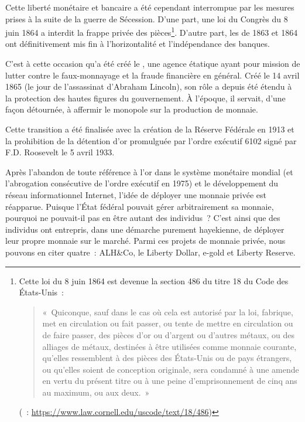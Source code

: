 Cette liberté monétaire et bancaire a été cependant interrompue par les mesures prises à la suite de la guerre de Sécession. D'une part, une loi du Congrès du 8 juin 1864 a interdit la frappe privée des pièces\footnote{Cette loi du 8 juin 1864 est devenue la section 486 du titre 18 du Code des États-Unis~:
\begin{quote}
\footnotesize «~Quiconque, sauf dans le cas où cela est autorisé par la loi, fabrique, met en circulation ou fait passer, ou tente de mettre en circulation ou de faire passer, des pièces d'or ou d'argent ou d'autres métaux, ou des alliages de métaux, destinées à être utilisées comme monnaie courante, qu'elles ressemblent à des pièces des États-Unis ou de pays étrangers, ou qu'elles soient de conception originale, sera condamné à une amende en vertu du présent titre ou à une peine d'emprisonnement de cinq ans au maximum, ou aux deux.~»
\end{quote} %
(~: \url{https://www.law.cornell.edu/uscode/text/18/486})}. D'autre part, les  de 1863 et 1864 ont définitivement mis fin à l'horizontalité et l'indépendance des banques.

C'est à cette occasion qu'a été créé le , une agence étatique ayant pour mission de lutter contre le faux-monnayage et la fraude financière en général. Créé le 14 avril 1865 (le jour de l'assassinat d'Abraham Lincoln), son rôle a depuis été étendu à la protection des hautes figures du gouvernement. À l'époque, il servait, d'une façon détournée, à affermir le monopole sur la production de monnaie.

Cette transition a été finalisée avec la création de la Réserve Fédérale en 1913 et la prohibition de la détention d'or promulguée par l'ordre exécutif 6102 signé par F.D. Roosevelt le 5 avril 1933.

Après l'abandon de toute référence à l'or dans le système monétaire mondial (et l'abrogation consécutive de l'ordre exécutif en 1975) et le développement du réseau informationnel Internet, l'idée de déployer une monnaie privée est réapparue. Puisque l'État fédéral pouvait gérer arbitrairement sa monnaie, pourquoi ne pouvait-il pas en être autant des individus~? C'est ainsi que des individus ont entrepris, dans une démarche purement hayekienne, de déployer leur propre monnaie sur le marché. Parmi ces projets de monnaie privée, nous pouvons en citer quatre~: ALH\&Co, le Liberty Dollar, e-gold et Liberty Reserve.

